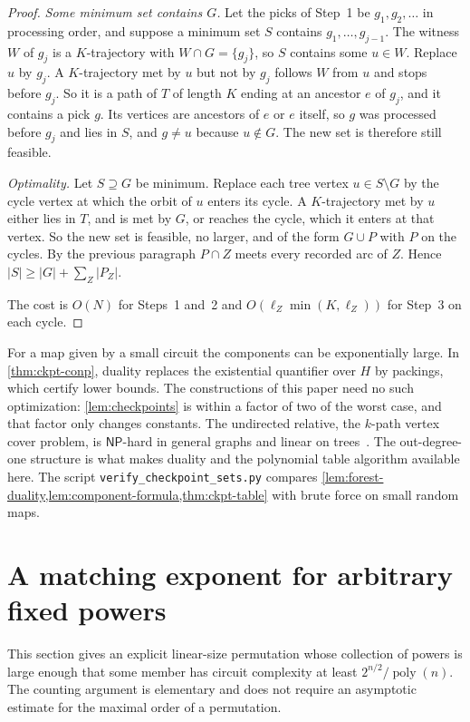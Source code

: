 \documentclass[11pt]{article}
\theoremstyle{definition}
\theoremstyle{remark}
\newcommand{\poly}{\operatorname{poly}}
\numberwithin{equation}{section}
\begin{document}
\begin{proof}
\emph{Some minimum set contains $G$.}  Let the picks of Step~1 be
$g_1,g_2,\ldots$ in processing order, and suppose a minimum set $S$
contains $g_1,\ldots,g_{j-1}$.  The witness $W$ of $g_j$ is a
$K$-trajectory with $W\cap G=\{g_j\}$, so $S$ contains some $u\in W$.
Replace $u$ by $g_j$.  A $K$-trajectory met by $u$ but not by $g_j$
follows $W$ from $u$ and stops before $g_j$.  So it is a path of $T$ of
length $K$ ending at an ancestor $e$ of $g_j$, and it contains a pick
$g$.  Its vertices are ancestors of $e$ or $e$ itself, so $g$ was
processed before $g_j$ and lies in $S$, and $g\neq u$ because $u\notin
G$.  The new set is therefore still feasible.

\emph{Optimality.}  Let $S\supseteq G$ be minimum.  Replace each tree
vertex $u\in S\setminus G$ by the cycle vertex at which the orbit of $u$
enters its cycle.  A $K$-trajectory met by $u$ either lies in $T$, and is
met by $G$, or reaches the cycle, which it enters at that vertex.  So the
new set is feasible, no larger, and of the form $G\cup P$ with $P$ on the
cycles.  By the previous paragraph $P\cap Z$ meets every recorded arc of
$Z$.  Hence $|S|\geq|G|+\sum_Z|P_Z|$.

The cost is $O(N)$ for Steps~1 and~2 and $O(\ell_Z\min(K,\ell_Z))$ for
Step~3 on each cycle.
\end{proof}

For a map given by a small circuit the components can be exponentially
large.  In \cref{thm:ckpt-conp}, duality replaces the existential
quantifier over $H$ by packings, which certify lower bounds.  The
constructions of this paper need no such optimization:
\cref{lem:checkpoints} is within a factor of two of the worst case, and
that factor only changes constants.
The undirected relative, the $k$-path vertex cover problem, is
$\mathsf{NP}$-hard in general graphs and linear on
trees~\cite{BKKS11}.  The out-degree-one structure is what makes
duality and the polynomial table algorithm available here.
The script \texttt{verify\_checkpoint\_sets.py} compares
\cref{lem:forest-duality,lem:component-formula,thm:ckpt-table} with brute
force on small random maps.

\section{A matching exponent for arbitrary fixed powers}\label{sec:lower}

This section gives an explicit linear-size permutation whose collection
of powers is large enough that some member has circuit complexity at
least $2^{n/2}/\poly(n)$.  The counting argument is elementary and does
not require an asymptotic estimate for the maximal order of a permutation.
\end{document}
